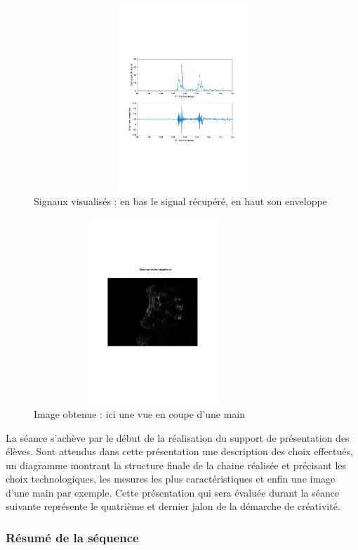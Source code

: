 \documentclass[12pt]{article}
\begin{document}
\begin{figure}[!h]
\centering
\includegraphics[width=15cm,height=7cm,trim=1.5cm 7cm 2cm 6cm, clip=true]{Images_Rapport/releve}
\caption{Signaux visualisés : en bas le signal récupéré, en haut son enveloppe}
\end{figure}

\begin{figure}[!h]
\centering
\includegraphics[width=9cm,height=7cm,trim=6cm 8cm 3cm 7cm, clip=true]{Images_Rapport/main}
\caption{Image obtenue : ici une vue en coupe d'une main}
\end{figure}


La séance s'achève par le début de la réalisation du support de présentation des élèves. Sont attendus dans cette présentation une description des choix effectués, un diagramme montrant la structure finale de la chaine réalisée et précisant les choix technologiques, les mesures les plus caractéristiques et enfin une image d'une main par exemple. Cette présentation qui sera évaluée durant la séance suivante représente le quatrième et dernier jalon de la démarche de créativité.

\newpage

\subsubsection{Résumé de la séquence}
\end{document}
